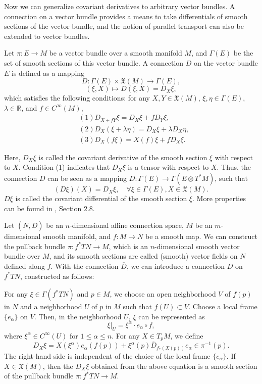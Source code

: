 \documentclass{ctexart}
\begin{document}
Now we can generalize covariant derivatives to arbitrary vector bundles. A connection on a vector bundle provides a means to take differentials of smooth sections 
of the vector bundle, and the notion of parallel transport can also be extended to vector bundles.
\begin{definition}
  Let $\pi: E \rightarrow M$ be a vector bundle over a smooth manifold $M$, and $\Gamma(E)$ be the set of smooth sections of this vector bundle. A connection $D$ on the vector bundle $E$ is defined as a mapping
  $$
  D: \Gamma(E) \times \mathfrak{X}(M) \rightarrow \Gamma(E),
  $$
  $$
  (\xi, X) \mapsto D(\xi, X) = D_X \xi,
  $$
  which satisfies the following conditions: for any $X, Y \in \mathfrak{X}(M)$, $\xi, \eta \in \Gamma(E)$, $\lambda \in \mathbb{R}$, and $f \in C^\infty(M)$,
  \begin{align*}
    &(1) D_{X+fY}\xi = D_X \xi + fD_Y \xi,\\
    &(2) D_X (\xi + \lambda \eta) = D_X \xi + \lambda D_X \eta,\\
    &(3) D_X (f \xi) = X(f)\xi + f D_X \xi.
  \end{align*}
\end{definition}
Here, $D_X \xi$ is called the covariant derivative of the smooth section $\xi$ with respect to $X$. Condition (1) indicates that 
$D_X \xi$ is a tensor with respect to $X$. Thus, the connection $D$ can be seen as 
a mapping $D: \Gamma(E) \rightarrow \Gamma(E \otimes T^*M)$, such that
$$
(D\xi)(X) = D_X \xi, \quad \forall \xi \in \Gamma(E), X \in \mathfrak{X}(M).
$$
$D\xi$ is called the covariant differential of the smooth section $\xi$. More properties can be found in \cite{ChenWeiHuan2002}, Section 2.8.

Let $(N, \overline{D})$ be an $n$-dimensional affine connection space, $M$ be an $m$-dimensional smooth manifold, and $f: M \rightarrow N$ be a smooth map. 
We can construct the pullback bundle $\pi: f^* TN \rightarrow M$, which is an $n$-dimensional smooth vector bundle over $M$, and its smooth sections are called 
(smooth) vector fields on $N$ defined along $f$. With the connection $\overline{D}$, we can introduce a connection $D$ on $f^* TN$, 
constructed as follows:

For any $\xi \in \Gamma(f^* TN)$ and $p \in M$, we choose an open neighborhood $V$ of $f(p)$ in $N$ and a neighborhood $U$ of $p$ in $M$ such that $f(U) \subset V$. 
Choose a local frame $\{e_\alpha\}$ on $V$. Then, in the neighborhood $U$, $\xi$ can be represented as
$$
\left.\xi\right|_U = \xi^\alpha \cdot e_\alpha\circ f,
$$
where $\xi^\alpha \in C^\infty(U)$ for $1 \leq \alpha \leq n$. For any $X \in T_p M$, we define
$$
D_X \xi = X\left(\xi^\alpha\right) e_\alpha(f(p)) + \xi^\alpha(p) \overline{D}_{f_*(X(p))} e_\alpha \in \pi^{-1}(p).
$$
The right-hand side is independent of the choice of the local frame $\{e_\alpha\}$. If $X \in \mathfrak{X}(M)$, 
then the $D_X \xi$ obtained from the above equation is a smooth section of the pullback bundle $\pi: f^* TN \rightarrow M$. 
\end{document}
